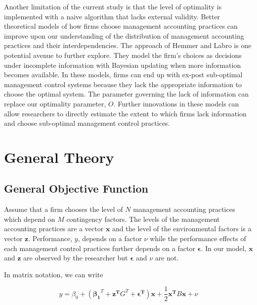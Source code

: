 \documentclass[12pt]{article}
\begin{document}
Another limitation of the current study is that the level of optimality is implemented with a naive algorithm that lacks external validity. Better theoretical models of how firms choose management accounting practices can improve upon our understanding of the distribution of management accounting practices and their interdependencies. The approach of Hemmer and Labro \citeyearpar{hemmer_management_2019} is one potential avenue to further explore. They model the firm's choices as decisions under incomplete information with Bayesian updating when more information becomes available. In these models, firms can end up with ex-post sub-optimal management control systems because they lack the appropriate information to choose the optimal system. The parameter governing the lack of information can replace our optimality parameter, \(O\). Further innovations in these models can allow researchers to directly estimate the extent to which firms lack information and choose sub-optimal management control practices.

\pagebreak
 
\appendix
\renewcommand{\theequation}{A.\arabic{equation}}
\setcounter{equation}{0}

\section{General Theory}\label{appendix-general}
\subsection{General Objective Function}
 
Assume that a firm chooses the level of $N$ management accounting practices which depend on $M$ contingency factors. The levels of the management accounting practices are a vector $\mathbf{x}$ and the level of the environmental factors is a vector $\mathbf{z}$. Performance, $y$, depends on a factor $\nu$ while the performance effects of each management control practices further depends on a factor $\mathbf{\epsilon}$. In our model, $\mathbf{x}$ and $\mathbf{z}$ are observed by the researcher but $\mathbf{\epsilon}$ and $\nu$ are not. 
 
 
In matrix notation, we can write
 
\begin{equation} \label{eq:structural-matrix}
y = \beta_0 + (\mathbf{\beta_1}^T + \mathbf{z^T} G^T + \mathbf{\epsilon^T})
     \mathbf{x} + \frac{1}{2}\mathbf{x^T} B \mathbf{x} + \nu
\end{equation}
\end{document}
